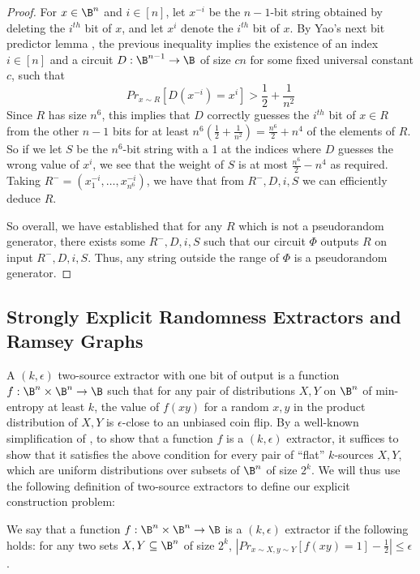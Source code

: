 \begin{proof}
For $x \in \B^n$ and $i \in [n]$, let $x^{-i}$ be the $n-1$-bit string obtained by deleting the $i^{th}$ bit of $x$, and let $x^i$ denote the $i^{th}$ bit of $x$. By Yao's next bit predictor lemma \cite{Yao} \cite{Vadhan}, the previous inequality implies the existence of an index $i \in [n]$ and a circuit $D: \B^{n-1} \rightarrow \B$ of size $cn$ for some fixed universal constant $c$, such that
\[
Pr_{x \sim R}[D(x^{-i}) = x^i] > \frac{1}{2} + \frac{1}{n^2}
\]
Since $R$ has size $n^6$, this implies that $D$ correctly guesses the $i^{th}$ bit of $x \in R$ from the other $n-1$ bits for at least $n^6(\frac{1}{2} + \frac{1}{n^2}) = \frac{n^6}{2} + n^4$ of the elements of $R$. So if we let $S$ be the $n^6$-bit string with a 1 at the indices where $D$ guesses the wrong value of $x^i$, we see that the weight of $S$ is at most $\frac{n^6}{2} - n^4$ as required. Taking $R^- = (x_1^{-i}, \ldots, x_{n^6}^{-i})$, we have that from $R^-,D,i,S$ we can efficiently deduce $R$.

So overall, we have established that for any $R$ which is not a pseudorandom generator, there exists some $R^-,D,i,S$ such that our circuit $\Phi$ outputs $R$ on input $R^-,D,i,S$. Thus, any string outside the range of $\Phi$ is a pseudorandom generator.
\end{proof}

\subsection{Strongly Explicit Randomness Extractors and Ramsey Graphs}

A $(k,\epsilon)$ two-source extractor with one bit of output is a function $f: \B^n \times \B^n \rightarrow \B$ such that for any pair of distributions $X,Y$ on $\B^n$ of min-entropy at least $k$, the value of $f(xy)$ for a random $x,y$ in the product distribution of $X,Y$ is $\epsilon$-close to an unbiased coin flip. By a well-known simplification of \cite{flat-sources}, to show that a function $f$ is a $(k,\epsilon)$ extractor, it suffices to show that it satisfies the above condition for every pair of ``flat'' $k$-sources $X,Y$, which are uniform distributions over subsets of $\B^n$ of size $2^k$. We will thus use the following definition of two-source extractors to define our explicit construction problem:
\begin{definition}
We say that a function $f:\B^n \times \B^n \rightarrow \B$ is a $(k,\epsilon)$ extractor if the following holds: for any two sets $X,Y \subseteq \B^n$ of size $2^k$, $|Pr_{x \sim X, y \sim Y}[f(xy) = 1] - \frac{1}{2}| \leq \epsilon$.
\end{definition}


